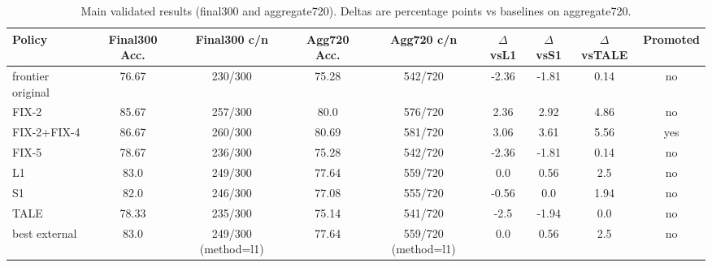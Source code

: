 \begin{table}[t]
\centering
\caption{Main validated results (final300 and aggregate720). Deltas are percentage points vs baselines on aggregate720.}
\label{tab:main_results}
\scriptsize
\begin{tabular}{lcccccccc}
\toprule
Policy & Final300 Acc. & Final300 c/n & Agg720 Acc. & Agg720 c/n & $\Delta$vsL1 & $\Delta$vsS1 & $\Delta$vsTALE & Promoted \\
\midrule
frontier original & 76.67 & 230/300 & 75.28 & 542/720 & -2.36 & -1.81 & 0.14 & no \\
FIX-2 & 85.67 & 257/300 & 80.0 & 576/720 & 2.36 & 2.92 & 4.86 & no \\
FIX-2+FIX-4 & 86.67 & 260/300 & 80.69 & 581/720 & 3.06 & 3.61 & 5.56 & yes \\
FIX-5 & 78.67 & 236/300 & 75.28 & 542/720 & -2.36 & -1.81 & 0.14 & no \\
L1 & 83.0 & 249/300 & 77.64 & 559/720 & 0.0 & 0.56 & 2.5 & no \\
S1 & 82.0 & 246/300 & 77.08 & 555/720 & -0.56 & 0.0 & 1.94 & no \\
TALE & 78.33 & 235/300 & 75.14 & 541/720 & -2.5 & -1.94 & 0.0 & no \\
best external & 83.0 & 249/300 (method=l1) & 77.64 & 559/720 (method=l1) & 0.0 & 0.56 & 2.5 & no \\
\bottomrule
\end{tabular}
\end{table}
